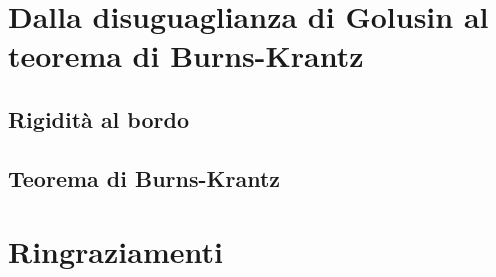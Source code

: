 \documentclass{article}
\begin{document}
\newpage

\section{Dalla disuguaglianza di Golusin al teorema di Burns-Krantz}

\subsection{Rigidità al bordo}


\subsection{Teorema di Burns-Krantz}


\newpage



\newpage

\section*{Ringraziamenti}

\end{document}

